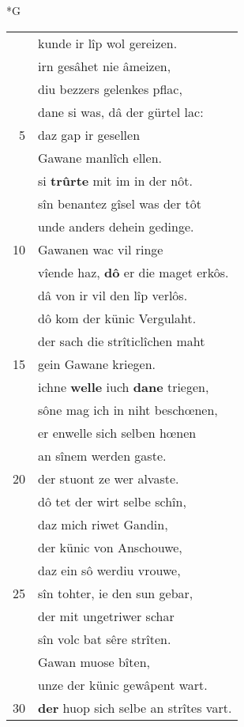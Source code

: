 \documentclass[8pt,a4paper,notitlepage]{article}
\begin{document}
\begin{table}[ht]
\begin{minipage}[t]{0.5\linewidth}
\small
\begin{center}*G
\end{center}
\begin{tabular}{rl}
 & kunde ir lîp wol gereizen.\\ 
 & irn gesâhet nie âmeizen,\\ 
 & diu bezzers gelenkes pflac,\\ 
 & dane si was, dâ der gürtel lac:\\ 
5 & daz gap ir gesellen\\ 
 & Gawane manlîch ellen.\\ 
 & si \textbf{trûrte} mit im in der nôt.\\ 
 & sîn benantez gîsel was der tôt\\ 
 & unde anders dehein gedinge.\\ 
10 & Gawanen wac vil ringe\\ 
 & vîende haz, \textbf{dô} er die maget erkôs.\\ 
 & dâ von ir vil den lîp verlôs.\\ 
 & dô kom der künic Vergulaht.\\ 
 & der sach die strîticlîchen maht\\ 
15 & gein Gawane kriegen.\\ 
 & ichne \textbf{welle} iuch \textbf{dane} triegen,\\ 
 & sône mag ich in niht beschœnen,\\ 
 & er enwelle sich selben hœnen\\ 
 & an sînem werden gaste.\\ 
20 & der stuont ze wer alvaste.\\ 
 & dô tet der wirt selbe schîn,\\ 
 & daz mich riwet Gandin,\\ 
 & der künic von Anschouwe,\\ 
 & daz ein sô werdiu vrouwe,\\ 
25 & sîn tohter, ie den sun gebar,\\ 
 & der mit ungetriwer schar\\ 
 & sîn volc bat sêre strîten.\\ 
 & Gawan muose bîten,\\ 
 & unze der künic gewâpent wart.\\ 
30 & \textbf{der} huop sich selbe an strîtes vart.\\ 
\end{tabular}

\end{minipage}
\end{table}
\end{document}
